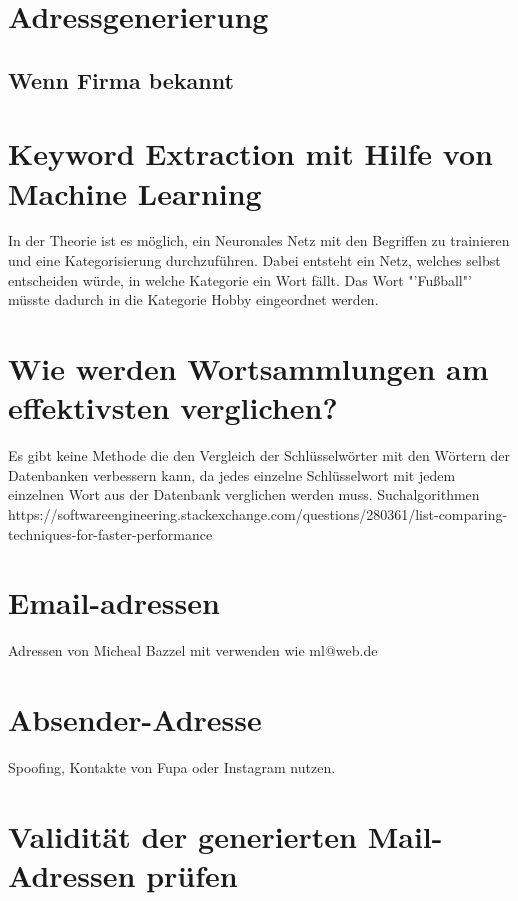 \section{Adressgenerierung}
	\subsection{Wenn Firma bekannt}
\section{Keyword Extraction mit Hilfe von Machine Learning}
\label{sec:KeywordExtractionMachine Learning}
In der Theorie ist es möglich, ein Neuronales Netz mit den Begriffen zu trainieren und eine Kategorisierung durchzuführen. Dabei entsteht ein Netz, welches selbst entscheiden würde, in welche Kategorie ein Wort fällt. Das Wort "'Fußball"' müsste dadurch in die Kategorie Hobby eingeordnet werden.

\section{Wie werden Wortsammlungen am effektivsten verglichen?}
Es gibt keine Methode die den Vergleich der Schlüsselwörter mit den Wörtern der Datenbanken verbessern kann, da jedes einzelne Schlüsselwort mit jedem einzelnen Wort aus der Datenbank verglichen werden muss. Suchalgorithmen\\
https://softwareengineering.stackexchange.com/questions/280361/list-comparing-techniques-for-faster-performance

\section{Email-adressen}
Adressen von Micheal Bazzel mit verwenden wie ml@web.de

\section{Absender-Adresse}
Spoofing, Kontakte von Fupa oder Instagram nutzen.

\section{Validität der generierten Mail-Adressen prüfen}

